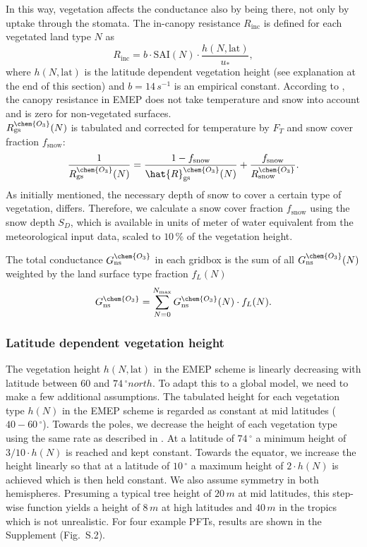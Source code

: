\documentclass[gmd, manuscript]{copernicus}
\begin{document}
In this way, vegetation affects the conductance also by being there, not only by uptake through the stomata. The in-canopy resistance $R_\text{inc}$ is defined for each vegetated land type $N$ as
\begin{equation}
  R_\text{inc} = b \cdot \text{SAI}(N) \cdot \frac{h(N, \text{lat})}{u_*},
\end{equation}
where $h(N, \text{lat})$ is the latitude dependent vegetation height (see explanation at the end of this section) and $b = 14\,\unit{s^{-1}}$ is an empirical constant. According to \citet{ACP:Simpson2012}, the canopy resistance in EMEP does not take temperature and snow into account and is zero for non-vegetated surfaces.\\
$R_\text{gs}^\chem{O_3}(N)$ is tabulated and corrected for temperature by $F_T$ and snow cover fraction $f_\text{snow}$:
\begin{equation}
  \frac{1}{R_\text{gs}^\chem{O_3}(N)} = \frac{1-f_\text{snow}}{\hat{R}_\text{gs}^\chem{O_3}(N)} + \frac{f_\text{snow}}{R_\text{snow}^\chem{O_3}}.
\end{equation}
As initially mentioned, the necessary depth of snow to cover a certain type of vegetation, differs. Therefore, we calculate a snow cover fraction $f_\text{snow}$ using the snow depth $S_D$, which is available in units of meter of water equivalent from the meteorological input data, scaled to $10\,\unit{\%}$ of the vegetation height.

The total conductance $G_\text{ns}^\chem{O_3}$ in each gridbox is the sum of all $G_\text{ns}^\chem{O_3}(N)$ weighted by the land surface type fraction $f_L(N)$
\begin{equation}
  G_\text{ns}^\chem{O_3} = \sum_{N=0}^{N_\text{max}}{G_\text{ns}^\chem{O_3}(N) \cdot f_L(N)}.
\end{equation}

\subsubsection*{Latitude dependent vegetation height}
The vegetation height $h(N, \text{lat})$ in the EMEP scheme is linearly decreasing with latitude between $60$ and $74\,\unit{^\circ north}$. To adapt this to a global model, we need to make a few additional assumptions. The tabulated height for each vegetation type $h(N)$ in the EMEP scheme is regarded as constant at mid latitudes ($40-60\,\unit{^\circ}$). Towards the poles, we decrease the height of each vegetation type using the same rate as described in \citet{ACP:Simpson2012}. At a latitude of $74\,\unit{^\circ}$ a minimum height of $3/10 \cdot h(N)$ is reached and kept constant. Towards the equator, we increase the height linearly so that at a latitude of $10\,\unit{^\circ}$ a maximum height of $2 \cdot h(N)$ is achieved which is then held constant. We also assume symmetry in both hemispheres. Presuming a typical tree height of $20\,\unit{m}$ at mid latitudes, this step-wise function yields a height of $8\,\unit{m}$ at high latitudes and $40\,\unit{m}$ in the tropics which is not unrealistic. For four example PFTs, results are shown in the Supplement (Fig.~S.2). 
\end{document}
